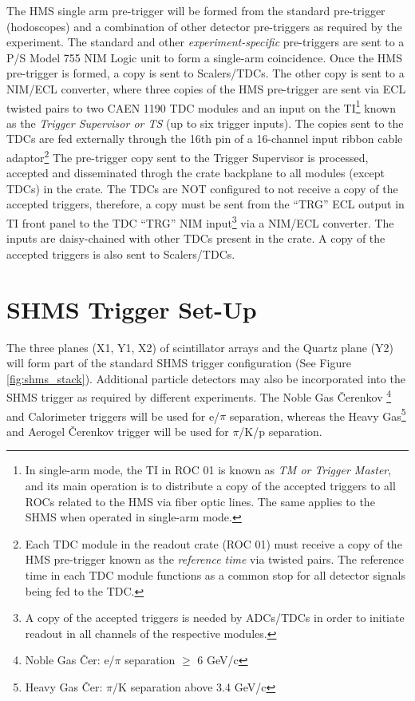 \documentclass[11pt]{article}
\begin{document}
\indent The HMS single arm pre-trigger will be formed from the standard pre-trigger (hodoscopes) and a combination of other detector pre-triggers as required by the
experiment. The standard and other \textit{experiment-specific} pre-triggers are sent to a P/S  Model 755 NIM Logic unit to form a single-arm coincidence.
Once the HMS pre-trigger is formed, a copy is sent to Scalers/TDCs. The other copy is sent to a NIM/ECL converter, where three copies of the HMS pre-trigger are sent
via ECL twisted pairs to two CAEN 1190 TDC modules and an input on the TI\footnote{In single-arm mode, the TI in ROC 01 is known as \textit{TM or Trigger Master}, and its main operation is to distribute a copy
of the accepted triggers to all ROCs related to the HMS via fiber optic lines. The same applies to the SHMS when operated in single-arm mode.} known as the \textit{Trigger Supervisor or TS} (up to six trigger inputs). The copies sent to
the TDCs are fed externally through the 16th pin of a 16-channel input ribbon cable adaptor\footnote{Each TDC module in the readout crate (ROC 01) must receive a copy of the HMS pre-trigger known as
the \textit{reference time} via twisted pairs. The reference time in each TDC module functions as a common stop for all detector signals being fed to the TDC.} The pre-trigger
copy sent to the Trigger Supervisor is processed, accepted and disseminated throgh the crate backplane to all modules (except TDCs) in the crate. The TDCs are NOT configured to not receive a copy
of the accepted triggers, therefore, a copy must be sent from the ``TRG'' ECL output in TI front panel to the TDC ``TRG'' NIM input\footnote{A copy of the accepted triggers is needed by ADCs/TDCs in order to initiate
readout in all channels of the respective modules.} via a NIM/ECL converter. The inputs are daisy-chained
with other TDCs present in the crate. A copy of the accepted triggers is also sent to Scalers/TDCs.

\newpage 
\section{SHMS Trigger Set-Up}
\indent The three planes (X1, Y1, X2) of scintillator arrays and the Quartz plane (Y2) will form part of the standard SHMS trigger configuration (See Figure \ref{fig:shms_stack}).  
Additional particle detectors may also be incorporated into the SHMS trigger as required by different experiments. The Noble Gas \v{C}erenkov \footnote{Noble Gas \v{C}er: e/$\pi$ separation $\geq$ 6 GeV/c} and
Calorimeter triggers will be used for e/$\pi$ separation, whereas the Heavy Gas\footnote{Heavy Gas \v{C}er: $\pi$/K separation above 3.4 GeV/c} and Aerogel \v{C}erenkov trigger will be used for $\pi$/K/p
separation\cite{SHMS_PID}. 
\end{document}
